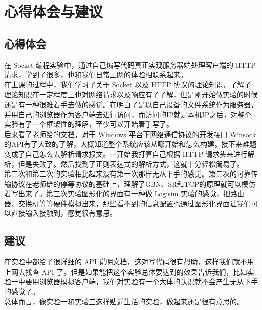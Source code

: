 \section{心得体会与建议}
\subsection{心得体会}
\hspace*{2em}在 Socket 编程实验中，通过自己编写代码真正实现服务器端处理客户端的 HTTP 请求，学到了很多，也和我们日常上网的体验相联系起来。\\
\hspace*{2em}在上课的过程中，我们学习了关于 Socket 以及 HTTP 协议的理论知识，了解了理论知识在一定程度上也对网络请求以及响应有了了解，但是刚开始做实验的时候还是有一种很难着手去做的感觉。在明白了是以自己设备的文件系统作为服务器，并用自己的浏览器作为客户端去进行访问，而访问的IP就是本机IP之后，对整个实验有了一个框架性的理解，至少可以开始着手写了。\\
\hspace*{2em}后来看了老师给的文档，对于 Windows 平台下网络通信协议的开发接口 Winsock 的API有了大致的了解，大概知道整个系统应该从哪开始和怎么构建。接下来难题变成了自己怎么去解析请求报文。一开始我打算自己根据 HTTP 请求头来进行解析，但是失败了。然后找到了正则表达式的解析方式，这就十分轻松简易了。\\
\hspace*{2em}第二次和第三次的实验相比起来没有第一次那样无从下手的感觉。第二次的可靠传输协议在老师给的停等协议的基础上，理解了GBN、SR和TCP的原理就可以模仿着写出来了。第三次实验图形化的界面有一种做 Logisim 实验的感觉，把路由器、交换机等等硬件模拟出来，那些看不到的信息配置也通过图形化界面让我们可以直接输入接触到，感觉很有意思。\\
\subsection{建议}
\hspace*{2em}在实验中都给了很详细的 API 说明文档，这对写代码很有帮助，这样我们就不用上网去找查 API 了。但是如果能把这个实验总体要达到的效果告诉我们，比如实验一中要用浏览器模拟客户端，我们对实验有一个大体的认识就不会产生无从下手的感觉了。\\
\hspace*{2em}总体而言，像实验一和实验三这样贴近生活的实验，做起来还是很有意思的。\\
